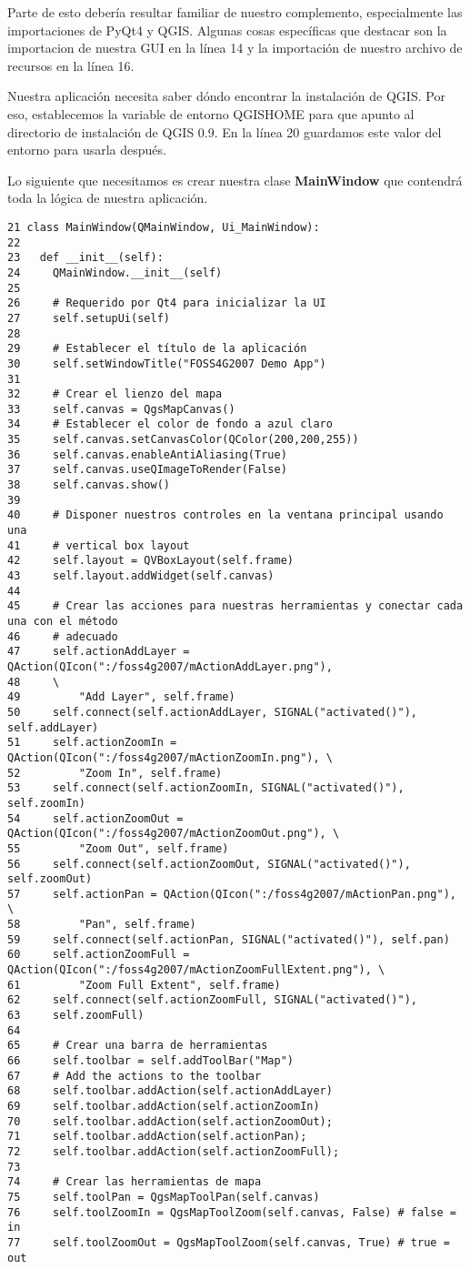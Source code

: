 Parte de esto debería resultar familiar de nuestro complemento, especialmente las importaciones de PyQt4 y
QGIS. Algunas cosas específicas que destacar son la importacion de nuestra GUI en la línea 14 y la
importación de nuestro archivo de recursos en la línea 16.

Nuestra aplicación necesita saber dóndo encontrar la instalación de QGIS. Por eso, establecemos la
variable de entorno QGISHOME para que apunto al directorio de instalación de QGIS 0.9. En la línea
20 guardamos este valor del entorno para usarla después.

Lo siguiente que necesitamos es crear nuestra clase \textbf{MainWindow} que contendrá toda la lógica de
nuestra aplicación.
\begin{verbatim}
21 class MainWindow(QMainWindow, Ui_MainWindow):
22 
23   def __init__(self):
24     QMainWindow.__init__(self)
25 
26     # Requerido por Qt4 para inicializar la UI
27     self.setupUi(self)
28 
29     # Establecer el título de la aplicación
30     self.setWindowTitle("FOSS4G2007 Demo App")
31 
32     # Crear el lienzo del mapa
33     self.canvas = QgsMapCanvas()
34     # Establecer el color de fondo a azul claro
35     self.canvas.setCanvasColor(QColor(200,200,255))
36     self.canvas.enableAntiAliasing(True)
37     self.canvas.useQImageToRender(False)
38     self.canvas.show()
39 
40     # Disponer nuestros controles en la ventana principal usando una 
41     # vertical box layout
42     self.layout = QVBoxLayout(self.frame)
43     self.layout.addWidget(self.canvas)
44 
45     # Crear las acciones para nuestras herramientas y conectar cada una con el método
46     # adecuado
47     self.actionAddLayer = QAction(QIcon(":/foss4g2007/mActionAddLayer.png"),
48     \
49         "Add Layer", self.frame)
50     self.connect(self.actionAddLayer, SIGNAL("activated()"), self.addLayer)
51     self.actionZoomIn = QAction(QIcon(":/foss4g2007/mActionZoomIn.png"), \
52         "Zoom In", self.frame)
53     self.connect(self.actionZoomIn, SIGNAL("activated()"), self.zoomIn)
54     self.actionZoomOut = QAction(QIcon(":/foss4g2007/mActionZoomOut.png"), \
55         "Zoom Out", self.frame)
56     self.connect(self.actionZoomOut, SIGNAL("activated()"), self.zoomOut)
57     self.actionPan = QAction(QIcon(":/foss4g2007/mActionPan.png"), \
58         "Pan", self.frame)
59     self.connect(self.actionPan, SIGNAL("activated()"), self.pan)
60     self.actionZoomFull = QAction(QIcon(":/foss4g2007/mActionZoomFullExtent.png"), \
61         "Zoom Full Extent", self.frame)
62     self.connect(self.actionZoomFull, SIGNAL("activated()"),
63     self.zoomFull)
64 
65     # Crear una barra de herramientas
66     self.toolbar = self.addToolBar("Map")
67     # Add the actions to the toolbar
68     self.toolbar.addAction(self.actionAddLayer)
69     self.toolbar.addAction(self.actionZoomIn)
70     self.toolbar.addAction(self.actionZoomOut);
71     self.toolbar.addAction(self.actionPan);
72     self.toolbar.addAction(self.actionZoomFull);
73 
74     # Crear las herramientas de mapa
75     self.toolPan = QgsMapToolPan(self.canvas)
76     self.toolZoomIn = QgsMapToolZoom(self.canvas, False) # false = in
77     self.toolZoomOut = QgsMapToolZoom(self.canvas, True) # true = out
\end{verbatim}

